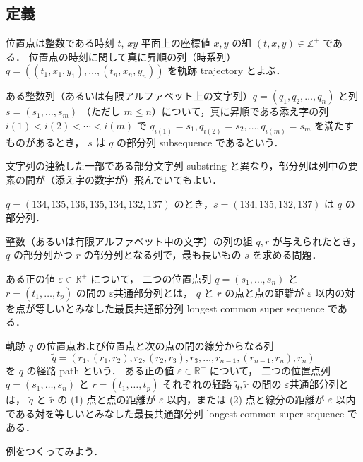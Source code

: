\documentclass[11pt]{jreport}
\begin{document}
\subsection*{定義}
位置点は整数である時刻 $t$, $xy$ 平面上の座標値 $x, y$ の組 $(t, x, y) \in \mathbb{Z}^+$ である． 
位置点の時刻に関して真に昇順の列（時系列） $q = ((t_1, x_1, y_1), \ldots,(t_n,x_n,y_n))$ を軌跡 trajectory とよぶ．

ある整数列（あるいは有限アルファベット上の文字列）$q = (q_1, q_2, \ldots, q_n)$ と列 $s = (s_1, \ldots, s_m)$ （ただし $m \leq n$）について，真に昇順である添え字の列 $i(1) < i(2) < \cdots < i(m)$ で $q_{i(1)} = s_1, q_{i(2)} = s_2, \ldots, q_{i(m)} = s_m$ を満たすものがあるとき，
$s$ は $q$ の部分列 subsequence であるという．

文字列の連続した一部である部分文字列 substring と異なり，部分列は列中の要素の間が（添え字の数字が）飛んでいてもよい．

\begin{example}
$q = (134, 135, 136, 135, 134, 132, 137)$ のとき，$s = (134, 135, 132, 137)$ は $q$ の部分列．
\end{example}

\begin{defn}
整数（あるいは有限アルファベット中の文字）の列の組 $q, r$ が与えられたとき，
$q$ の部分列かつ $r$ の部分列となる列で，最も長いもの $s$ を求める問題．
\end{defn}

\begin{defn}[2つの位置点列の最長共通部分列 (I)]
ある正の値 $\varepsilon \in \mathbb{R}^+$ について，
二つの位置点列 $q = (s_1, \ldots, s_n)$ と $r = (t_1, \ldots, t_p)$ の間の $\varepsilon$共通部分列とは，
 $q$ と $r$ の点と点の距離が $\varepsilon$ 以内の対を点が等しいとみなした最長共通部分列 longest common super sequence である．
\end{defn}

\begin{defn}[2つの位置点列の最長共通部分列 (II)]
軌跡 $q$ の位置点および位置点と次の点の間の線分からなる列
\[
\tilde{q} = (r_1, (r_1, r_2), r_2, (r_2, r_3), r_3, \ldots, r_{n-1}, (r_{n-1}, r_n), r_n)
\]
を $q$ の経路 path という．
ある正の値 $\varepsilon \in \mathbb{R}^+$ について，
二つの位置点列 $q = (s_1, \ldots, s_n)$ と $r = (t_1, \ldots, t_p)$ それぞれの経路 $\tilde{q}, \tilde{r}$ の間の $\varepsilon$共通部分列とは，
 $\tilde{q}$ と $\tilde{r}$ の (1) 点と点の距離が $\varepsilon$ 以内，または (2) 点と線分の距離が $\varepsilon$ 以内である対を等しいとみなした最長共通部分列 longest common super sequence である．
\end{defn}

\begin{example}
例をつくってみよう．
\end{example}
\end{document}
